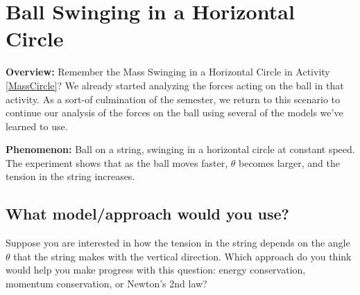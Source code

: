 \section{Ball Swinging in a Horizontal Circle}

\begin{overview}

	\textbf{Overview:} Remember the Mass Swinging in a Horizontal Circle in Activity \ref{MassCircle}? We already started analyzing the forces acting on the ball in that activity. As a sort-of culmination of the semester, we return to this scenario to continue our analysis of the forces on the ball using several of the models we've learned to use.
	
\end{overview}

\noindent\textbf{Phenomenon:} Ball on a string, swinging in a horizontal circle at constant speed. The experiment shows that as the ball moves faster, $\theta$ becomes larger, and the tension in the string increases.

\begin{center}
\end{center}


\subsection*{What model/approach would you use?}

Suppose you are interested in how the tension in the string depends on the angle $\theta$ that the string makes with the vertical direction. Which approach do you think would help you make progress with this question: energy conservation, momentum %
conservation, or Newton's 2nd law?\\


